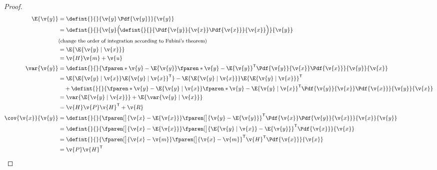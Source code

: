 \documentclass[english,12pt]{article}
\newcommand{\y}{\v{y}}
\newcommand{\x}{\v{x}}
\newcommand{\tr}{\mathsf{T}}
\theoremstyle{definition}
\begin{document}
\begin{proof}
\begin{align}
	\E{\y}&=\defint{}{}{\y\,\Pdf{\y}}{\y} \nonumber\\
	&=\defint{}{}{\y\Big(\!\defint{}{}{\Pdf{\y}{\x}\Pdf{\x}}{\x}\Big)}{\y}\nonumber\\
	&\mbox{{\small (change the order of integration according to Fubini's theorem)}}\nonumber\\
	&=\E{\E{\y\mid\x}}\\
	&=\v{H}\v{m}+\v{u}\\
	\var{\y}&=\defint{}{}{\fparen*{\y-\E{\y}}\fparen*{\y-\E{\y}}^\tr\Pdf{\y}{\x}\Pdf{\x}}{\y}{\x} \nonumber\\
	&=\E{\E{\y\mid\x}\E{\y\mid\x}^\tr}-\E{\E{\y\mid\x}}\E{\E{\y\mid\x}}^\tr \nonumber \\
&\quad+\defint{}{}{\fparen*{\y-\E{\y\mid\x}}\fparen*{\y-\E{\y\mid\x}}^\tr\Pdf{\y}{\x}\Pdf{\x}}{\y}{\x} \nonumber \\
	&= \var{\E{\y\mid\x}}+\E{\var{\y\mid\x}}\\
	&= \v{H}\v{P}\v{H}^\tr+\v{R}\\
	\cov{\x}{\y}&=\defint{}{}{\fparen[\big]{\x-\E{\x}}\fparen[\big]{\y-\E{\y}}^\tr\Pdf{\x}\Pdf{\y}{\x}}{\x}{\y} \nonumber\\
	&=\defint{}{}{\fparen[\big]{\x-\E{\x}}\fparen[\big]{\E{\y\mid\x}-\E{\y}}^\tr\Pdf{\x}}{\x} \nonumber\\
	&=\defint{}{}{\fparen[\big]{\x-\v{m}}\fparen[\big]{\x-\v{m}}^\tr\v{H}^\tr\Pdf{\x}}{\x} \nonumber\\
	&=\v{P}\v{H}^\tr
\end{align}%

\end{proof}
\end{document}
